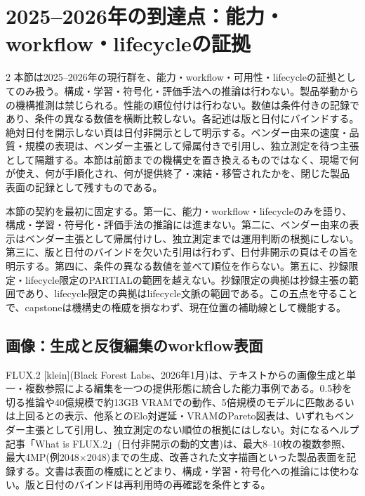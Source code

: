 \documentclass[lualatex,a4paper,10pt]{jlreq}
\begin{document}
\section{2025--2026年の到達点：能力・workflow・lifecycleの証拠}
\label{sec:capstones}

\begin{multicols}{2}
\raggedcolumns
本節は2025--2026年の現行群を、能力・workflow・可用性・lifecycleの証拠としてのみ扱う。構成・学習・符号化・評価手法への推論は行わない。製品挙動からの機構推測は禁じられる。性能の順位付けは行わない。数値は条件付きの記録であり、条件の異なる数値を横断比較しない。各記述は版と日付にバインドする。絶対日付を開示しない頁は日付非開示として明示する。ベンダー由来の速度・品質・規模の表現は、ベンダー主張として帰属付きで引用し、独立測定を待つ主張として隔離する。本節は前節までの機構史を置き換えるものではなく、現場で何が使え、何が手順化され、何が提供終了・凍結・移管されたかを、閉じた製品表面の記録として残すものである。

本節の契約を最初に固定する。第一に、能力・workflow・lifecycleのみを語り、構成・学習・符号化・評価手法の推論には進まない。第二に、ベンダー由来の表示はベンダー主張として帰属付けし、独立測定までは運用判断の根拠にしない。第三に、版と日付のバインドを欠いた引用は行わず、日付非開示の頁はその旨を明示する。第四に、条件の異なる数値を並べて順位を作らない。第五に、抄録限定・lifecycle限定のPARTIALの範囲を越えない。抄録限定の典拠は抄録主張の範囲であり、lifecycle限定の典拠はlifecycle文脈の範囲である\autocite{btd076}\autocite{btd106}。この五点を守ることで、capstoneは機構史の権威を損なわず、現在位置の補助線として機能する。

\subsection{画像：生成と反復編集のworkflow表面}
FLUX.2 [klein](Black Forest Labs、2026年1月)は、テキストからの画像生成と単一・複数参照による編集を一つの提供形態に統合した能力事例である\autocite{btd100}。0.5秒を切る推論や40億規模で約13GB VRAMでの動作、5倍規模のモデルに匹敵あるいは上回るとの表示、他系とのElo対遅延・VRAMのPareto図表は、いずれもベンダー主張として引用し、独立測定のない順位の根拠にはしない。対になるヘルプ記事「What is FLUX.2」(日付非開示の動的文書)は、最大8--10枚の複数参照、最大4MP(例2048$\times$2048)までの生成、改善された文字描画といった製品表面を記録する\autocite{btd101}。文書は表面の権威にとどまり、構成・学習・符号化への推論には使わない。版と日付のバインドは再利用時の再確認を条件とする。


\end{multicols}
\end{document}
